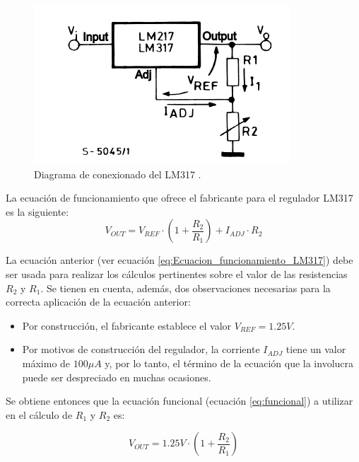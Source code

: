 \begin{figure}[H]
    \centering 
    \includegraphics[width=.6\linewidth]{pictures/LM317 conexionado.PNG}
    \caption{Diagrama de conexionado del LM317 \cite{noauthor_lm317_nodate}.}
    \label{fig:LM317_Conexionado}
\end{figure}

La ecuación de funcionamiento que ofrece el fabricante para el regulador LM317 es la siguiente:
\begin{equation}
    V_{OUT} = V_{REF} \cdot \left( 1 + \frac{R_2}{R_1}\right) + I_{ADJ} \cdot R_2
    \label{eq:Ecuacion_funcionamiento_LM317}
\end{equation}

La ecuación anterior (ver ecuación \ref{eq:Ecuacion_funcionamiento_LM317}) debe ser usada para realizar los cálculos pertinentes sobre el valor de las resistencias $R_2$ y $R_1$. Se tienen en cuenta, además, dos observaciones necesarias para la correcta aplicación de la ecuación anterior:
\begin{itemize}
    \item Por construcción, el fabricante establece el valor $V_{REF} = 1.25V$.
    \item Por motivos de construcción del regulador, la corriente $I_{ADJ}$ tiene un valor máximo de $100 \mu A$ y, por lo tanto, el término de la ecuación que la involucra puede ser despreciado en muchas ocasiones.
\end{itemize}

Se obtiene entonces que la ecuación funcional (ecuación \ref{eq:funcional}) a utilizar en el cálculo de $R_1$ y $R_2$ es:

\begin{equation}
    V_{OUT} = 1.25V \cdot \left( 1 + \frac{R_2}{R_1}\right) 
    \label{eq:funcional}
\end{equation}

